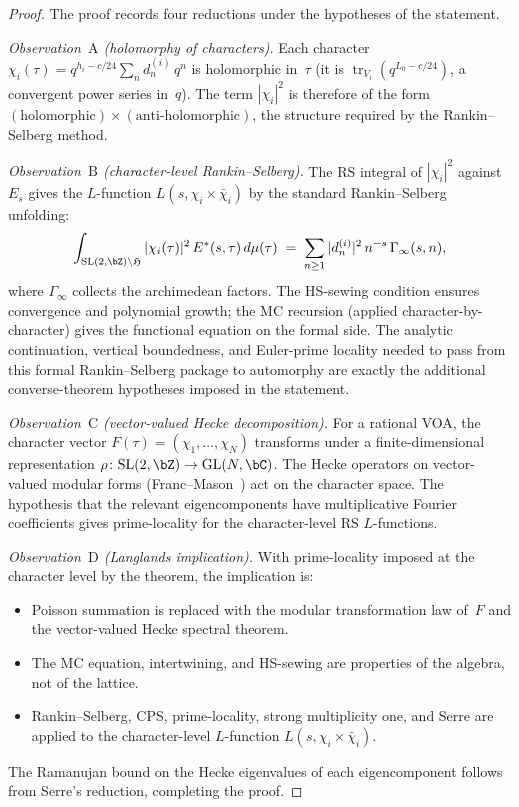 \begin{proof}
The proof records four reductions under the hypotheses of the
statement.

\smallskip
\emph{Observation~$\mathrm{A}$
\textup{(}holomorphy of characters\textup{)}.}
Each character $\chi_i(\tau) = q^{h_i-c/24}\sum_n d_n^{(i)}\,q^n$
is holomorphic in~$\tau$ (it is
$\operatorname{tr}_{V_i}(q^{L_0-c/24})$, a convergent power
series in~$q$). The term $|\chi_i|^2$ is therefore of the form
$(\text{holomorphic})\times(\text{anti-holomorphic})$,
the structure required by the Rankin--Selberg method.

\smallskip
\emph{Observation~$\mathrm{B}$
\textup{(}character-level Rankin--Selberg\textup{)}.}
The RS integral of $|\chi_i|^2$ against~$E_s$ gives the
$L$-function $L(s, \chi_i \times \bar\chi_i)$ by the standard
Rankin--Selberg unfolding:
\[
 \int_{\mathrm{SL}(2,\bZ)\backslash\mathfrak{H}}
 |\chi_i(\tau)|^2\,E^*(s,\tau)\,d\mu(\tau)
 \;=\;
 \sum_{n\ge1} |d_n^{(i)}|^2\,
 n^{-s}\,\Gamma_\infty(s,n),
\]
where $\Gamma_\infty$ collects the archimedean factors.
The HS-sewing condition ensures convergence and polynomial
growth; the MC recursion (applied character-by-character)
gives the functional equation on the formal side. The analytic
continuation, vertical boundedness, and Euler-prime locality needed
to pass from this formal Rankin--Selberg package to automorphy are
exactly the additional converse-theorem hypotheses imposed in the
statement.

\smallskip
\emph{Observation~$\mathrm{C}$
\textup{(}vector-valued Hecke decomposition\textup{)}.}
For a rational VOA, the character vector
$F(\tau) = (\chi_1,\dotsc,\chi_N)$ transforms under a
finite-dimensional representation
$\rho\colon \mathrm{SL}(2,\bZ) \to \mathrm{GL}(N,\bC)$.
The Hecke operators on vector-valued modular forms
(Franc--Mason~\cite{FrancMason2017}) act on the character space.
The hypothesis that the relevant eigencomponents have
multiplicative Fourier coefficients gives prime-locality for the
character-level RS $L$-functions.

\smallskip
\emph{Observation~$\mathrm{D}$
\textup{(}Langlands implication\textup{)}.}
With prime-locality imposed at the character level by the theorem,
the implication is:
\begin{itemize}[nosep]
\item Poisson summation is replaced
 with the modular transformation law of~$F$ and the
 vector-valued Hecke spectral theorem.
\item The MC equation, intertwining, and
 HS-sewing are properties of the algebra, not of
 the lattice.
\item Rankin--Selberg, CPS, prime-locality, strong
 multiplicity one, and Serre are applied to the
 character-level $L$-function
 $L(s, \chi_i \times \bar\chi_i)$.
\end{itemize}
The Ramanujan bound on the Hecke eigenvalues of each
eigencomponent follows from Serre's reduction,
completing the proof.
\end{proof}

